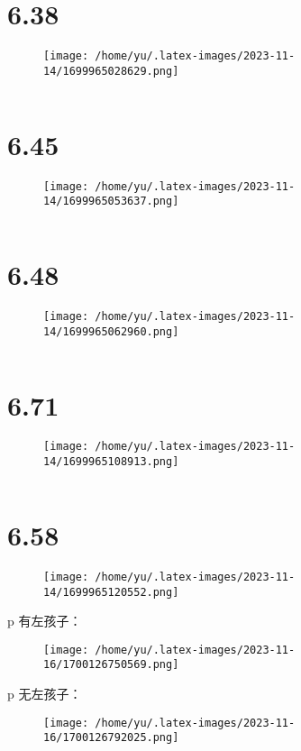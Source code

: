 \documentclass[14pt]{extarticle}
\begin{document}
\section{6.38}
\begin{figure}[H]
    \centering
    \texttt{[image: /home/yu/.latex-images/2023-11-14/1699965028629.png]}
\end{figure}


\inputminted{cpp}{6.38.cpp}


\section{6.45}
\begin{figure}[H]
    \centering
    \texttt{[image: /home/yu/.latex-images/2023-11-14/1699965053637.png]}
\end{figure}


\inputminted{cpp}{6.45.cpp}


\section{6.48}
\begin{figure}[H]
    \centering
    \texttt{[image: /home/yu/.latex-images/2023-11-14/1699965062960.png]}
\end{figure}


\inputminted{cpp}{6.48.cpp}


\section{6.71}
\begin{figure}[H]
    \centering
    \texttt{[image: /home/yu/.latex-images/2023-11-14/1699965108913.png]}
\end{figure}


\inputminted{cpp}{6.71.cpp}


\section{6.58}
\begin{figure}[H]
    \centering
    \texttt{[image: /home/yu/.latex-images/2023-11-14/1699965120552.png]}
\end{figure}

p 有左孩子：
\begin{figure}[H]
    \centering
    \texttt{[image: /home/yu/.latex-images/2023-11-16/1700126750569.png]}
\end{figure}
p 无左孩子：
\begin{figure}[H]
    \centering
    \texttt{[image: /home/yu/.latex-images/2023-11-16/1700126792025.png]}
\end{figure}
\end{document}
